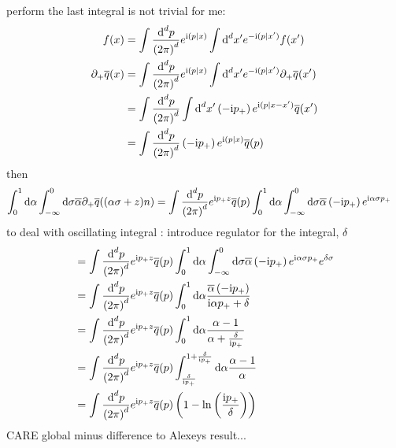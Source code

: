 perform the last integral is not trivial for me:
\begin{align}
	f(x) 
	&=
	\int \dxfm{p}{d} \expo^{\imag \skp{p}{x}} \int \dxfs{x'}{d} \expo^{-\imag\skp{p}{x'}} f(x')
	\\
	\partial_+\qbar(x) 
	&=
	\int \dxfm{p}{d} \expo^{\imag \skp{p}{x}} \int \dxfs{x'}{d} \expo^{-\imag\skp{p}{x'}} \partial_+\qbar(x')
	\\
	&=
	\int \dxfm{p}{d} \int \dxfs{x'}{d} \left(-\imag \pp\right)\expo^{\imag\skp{p}{x-x'}}\qbar(x')
	\\
	&=
	\int \dxfm{p}{d} \left(-\imag \pp\right)\expo^{\imag\skp{p}{x}}\qbar(p)
\end{align}
then 
\begin{align}
	\int _0^1\dx \alpha \int _{-\infty}^{0} \dx \sigma \overline \alpha \partial_+ \qbar((\alpha\sigma+z)n)
	&=
	\int \dxfm{p}{d}\expo^{\imag \pp z}\qbar(p)\int _0^1\dx \alpha \int _{-\infty}^{0} \dx \sigma \overline \alpha \left(-\imag \pp\right)\expo^{\imag \alpha \sigma \pp}
\end{align}
to deal with oscillating integral : introduce regulator for the integral, $\delta$
\begin{align}
	&=
	\int \dxfm{p}{d}\expo^{\imag \pp z}\qbar(p)\int _0^1\dx \alpha \int _{-\infty}^{0} \dx \sigma \overline \alpha\left(-\imag \pp\right) \expo^{\imag \alpha \sigma \pp}\expo^{\delta\sigma}
	\\
	&=
	\int \dxfm{p}{d}\expo^{\imag \pp z}\qbar(p)\int _0^1\dx \alpha  \frac{\overline \alpha \left(-\imag \pp\right)}{\imag \alpha \pp + \delta}
	\\
	&=
	\int \dxfm{p}{d}\expo^{\imag \pp z}\qbar(p)\int _0^1\dx \alpha  \frac{\alpha-1 }{\alpha + \frac{\delta}{\imag \pp}}
	\\
		&=
	\int \dxfm{p}{d}\expo^{\imag \pp z}\qbar(p)\int _{\frac{\delta}{\imag \pp}}^{1+\frac{\delta}{\imag \pp}}\dx \alpha  \frac{\alpha-1 }{\alpha}
	\\
	&=
	\int \dxfm{p}{d}\expo^{\imag \pp z}\qbar(p) \left(1-\ln\left(\frac{\imag \pp}{\delta}\right)\right)
\end{align}
CARE global minus difference to Alexeys result...  
\ifdefined\mainprogram{}
\else

\fi